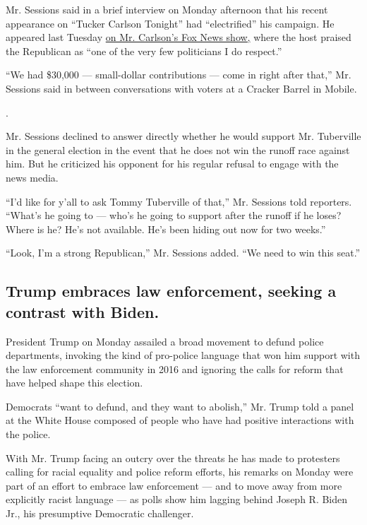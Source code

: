 Mr. Sessions said in a brief interview on Monday afternoon that his
recent appearance on ``Tucker Carlson Tonight'' had ``electrified'' his
campaign. He appeared last Tuesday
\href{https://www.youtube.com/watch?v=ORR2obSy_yM}{on Mr. Carlson's Fox
News show,} where the host praised the Republican as ``one of the very
few politicians I do respect.''

``We had \$30,000 --- small-dollar contributions --- come in right after
that,'' Mr. Sessions said in between conversations with voters at a
Cracker Barrel in Mobile.

.

Mr. Sessions declined to answer directly whether he would support Mr.
Tuberville in the general election in the event that he does not win the
runoff race against him. But he criticized his opponent for his regular
refusal to engage with the news media.

``I'd like for y'all to ask Tommy Tuberville of that,'' Mr. Sessions
told reporters. ``What's he going to --- who's he going to support after
the runoff if he loses? Where is he? He's not available. He's been
hiding out now for two weeks.''

``Look, I'm a strong Republican,'' Mr. Sessions added. ``We need to win
this seat.''

\hypertarget{trump-embraces-law-enforcement-seeking-a-contrast-with-biden}{%
\subsection{Trump embraces law enforcement, seeking a contrast with
Biden.}\label{trump-embraces-law-enforcement-seeking-a-contrast-with-biden}}

President Trump on Monday assailed a broad movement to defund police
departments, invoking the kind of pro-police language that won him
support with the law enforcement community in 2016 and ignoring the
calls for reform that have helped shape this election.

Democrats ``want to defund, and they want to abolish,'' Mr. Trump told a
panel at the White House composed of people who have had positive
interactions with the police.

With Mr. Trump facing an outcry over the threats he has made to
protesters calling for racial equality and police reform efforts, his
remarks on Monday were part of an effort to embrace law enforcement ---
and to move away from more explicitly racist language --- as polls show
him lagging behind Joseph R. Biden Jr., his presumptive Democratic
challenger.

